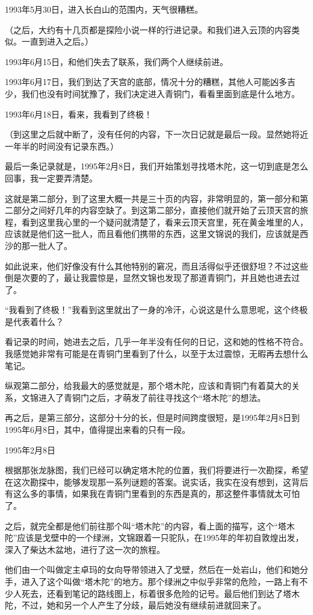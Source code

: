 1993年5月30日，进入长白山的范围内，天气很糟糕。

（之后，大约有十几页都是探险小说一样的行进记录。和我们进入云顶的内容类似。一直到进入之后。）

1993年6月15日，和他们失去了联系，我们两个人继续前进。

1993年6月17日，我们到达了天宫的底部，情况十分的糟糕，其他人可能凶多吉少，我们也没有时间犹豫了，我们决定进入青铜门，看看里面到底是什么地方。

1993年6月18日，看来，我看到了终极！

（到这里之后就中断了，没有任何的内容，下一次日记就是最后一段。显然她将近一年半的时间没有记录东西。）

最后一条记录就是，1995年2月8日，我们开始策划寻找塔木陀，这一切到底是怎么回事，我一定要弄清楚。

这就是第二部分，到了这里大概一共是三十页的内容，非常明显的，第一部分和第二部分之间好几年的内容空缺了。到这第二部分，直接他们就开始了云顶天宫的旅程，看到这里我心里的一个疑问就清楚了，看来云顶天宫里，死在黄金堆里的人，应该就是他们这一批人，而且看他们携带的东西，这里文锦说的我们，应该就是西沙的那一批人了。

如此说来，他们好像没有什么其他特别的窘况，而且活得似乎还很舒坦？不过这些倒是次要的了，最让我震惊是，显然文锦也发现了那道青铜门，并且她也进去过了。

“我看到了终极！”我看到这里就出了一身的冷汗，心说这是什么意思呢，这个终极是代表着什么？

看记录的时间，她进去之后，几乎一年半没有任何的日记，这和她的性格不符合。我感觉她非常有可能是在青铜门里看到了什么，以至于太过震惊，无暇再去想什么笔记。

纵观第二部分，给我最大的感觉就是，那个塔木陀，应该和青铜门有着莫大的关系，文锦进入了青铜门之后，才萌发了前往寻找这个“塔木陀”的想法。

再之后，是第三部分，这部分十分的长，但是时间跨度很短，是1995年2月8日到1995年6月8日，其中，值得提出来看的只有一段。

1995年2月8日

根据那张龙脉图，我们已经可以确定塔木陀的位置，我们将要进行一次勘探，希望在这次勘探中，能够发现那一系列谜题的答案。说实话，我实在没有想到，这背后有这么多的事情，如果我在青铜门里看到的东西是真的，那这整件事情就太可怕了。

之后，就完全都是他们前往那个叫“塔木陀”的内容，看上面的描写，这个“塔木陀”应该是戈壁中的一个绿洲，文锦跟着一只驼队，在1995年的年初自敦煌出发，深入了柴达木盆地，进行了这一次的旅程。

他们由一个叫做定主卓玛的女向导带领进入了戈壁，然后在一处岩山，他们和她分手，进入了这个叫做“塔木陀”的地方。那个绿洲之中似乎非常的危险，一路上有不少人死去，还看到笔记的路线图上，标着很多危险的记号。最后他们到达了塔木陀，不过，她和另一个人产生了分歧，最后她没有继续前进就回来了。

